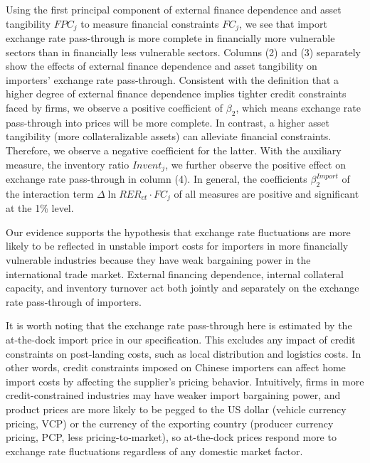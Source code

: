 Using the first principal component of external finance dependence and asset tangibility $FPC_j$ to measure financial constraints $FC_j$, we see that import exchange rate pass-through is more complete in financially more vulnerable sectors than in financially less vulnerable sectors. Columns (2) and (3) separately show the effects of external finance dependence and asset tangibility on importers' exchange rate pass-through. Consistent with the definition that a higher degree of external finance dependence implies tighter credit constraints faced by firms, we observe a positive coefficient of $\beta_2$, which means exchange rate pass-through into prices will be more complete. In contrast, a higher asset tangibility (more collateralizable assets) can alleviate financial constraints. Therefore, we observe a negative coefficient for the latter. With the auxiliary measure, the inventory ratio $Invent_j$, we further observe the positive effect on exchange rate pass-through in column (4). In general, the coefficients $\beta^{Import}_2$ of the interaction term $\Delta \ln RER_{ct} \cdot FC_{j}$ of all measures are positive and significant at the 1\% level. 

Our evidence supports the hypothesis that exchange rate fluctuations are more likely to be reflected in unstable import costs for importers in more financially vulnerable industries because they have weak bargaining power in the international trade market. External financing dependence, internal collateral capacity, and inventory turnover act both jointly and separately on the exchange rate pass-through of importers.

It is worth noting that the exchange rate pass-through here is estimated by the at-the-dock import price in our specification. This excludes any impact of credit constraints on post-landing costs, such as local distribution and logistics costs. In other words, credit constraints imposed on Chinese importers can affect home import costs by affecting the supplier's pricing behavior. Intuitively, firms in more credit-constrained industries may have weaker import bargaining power, and product prices are more likely to be pegged to the US dollar (vehicle currency pricing, VCP) or the currency of the exporting country (producer currency pricing, PCP, less pricing-to-market), so at-the-dock prices respond more to exchange rate fluctuations regardless of any domestic market factor.

